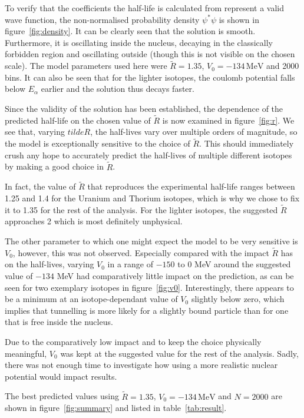 \documentclass[a4paper,DIV=12,english]{scrartcl}
\begin{document}
To verify that the coefficients the half-life is calculated from represent a valid wave function, the non-normalised probability density $\psi^* \psi$ is shown in figure~\ref{fig:density}. It can be clearly seen that the solution is smooth. Furthermore, it is oscillating inside the nucleus, decaying in the classically forbidden region and oscillating outside (though this is not visible on the chosen scale). The model parameters used here were $\tilde R = 1.35$, $V_0 = - 134\,\text{MeV}$ and 2000 bins. It can also be seen that for the lighter isotopes, the coulomb potential falls below $E_\alpha$ earlier and the solution thus decays faster.

Since the validity of the solution has been established, the dependence of the predicted half-life on the chosen value of $\tilde R$ is now examined in figure~\ref{fig:r}. We see that, varying $tilde R$, the half-lives vary over multiple orders of magnitude, so the model is exceptionally sensitive to the choice of $\tilde R$. This should immediately crush any hope to accurately predict the half-lives of multiple different isotopes by making a good choice in $\tilde R$.

In fact, the value of $\tilde R$ that reproduces the experimental half-life ranges between 1.25 and 1.4 for the Uranium and Thorium isotopes, which is why we chose to fix it to 1.35 for the rest of the analysis. For the lighter isotopes, the suggested $\tilde R$ approaches 2 which is most definitely unphysical. 

The other parameter to which one might expect the model to be very sensitive is $V_0$, however, this was not observed. Especially compared with the impact $\tilde R$ has on the half-lives, varying $V_0$ in a range of $-150$ to $0$ MeV around the suggested value of $-134$ MeV had comparatively little impact on the prediction, as can be seen for two exemplary isotopes in figure~\ref{fig:v0}. Interestingly, there appears to be a minimum at an isotope-dependant value of $V_0$ slightly below zero, which implies that tunnelling is more likely for a slightly bound particle than for one that is free inside the nucleus.

Due to the comparatively low impact and to keep the choice physically meaningful, $V_0$ was kept at the suggested value for the rest of the analysis. Sadly, there was not enough time to investigate how using a more realistic nuclear potential would impact results.

The best predicted values using $\tilde R = 1.35$, $V_0=-134\,\text{MeV}$ and $N = 2000$ are shown in figure~\ref{fig:summary} and listed in table~\ref{tab:result}. 
\end{document}
